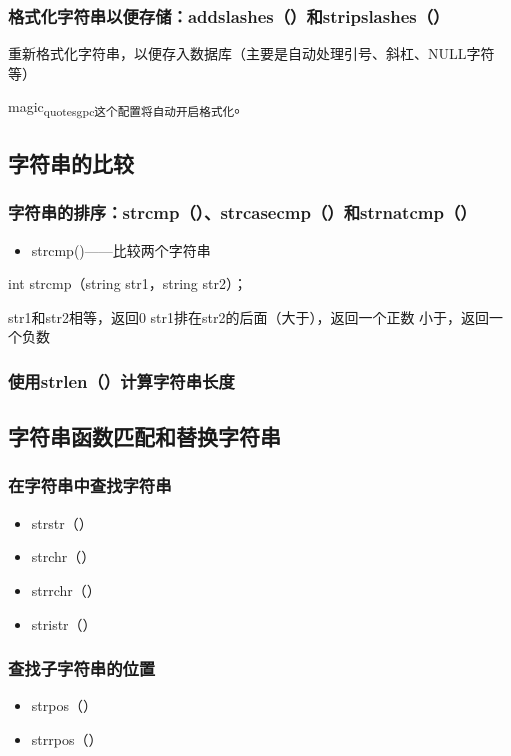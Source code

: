 \documentclass[11pt]{article}
\begin{document}
\subsubsection{格式化字符串以便存储：addslashes（）和stripslashes（）}
\label{sec:orgb579952}
重新格式化字符串，以便存入数据库（主要是自动处理引号、斜杠、NULL字符等）

magic\textsubscript{quotes}\textsubscript{gpc这个配置将自动开启格式化}。
\subsection{字符串的比较}
\label{sec:orgff0bb8f}
\subsubsection{字符串的排序：strcmp（）、strcasecmp（）和strnatcmp（）}
\label{sec:orgf145227}
\begin{itemize}
\item strcmp()——比较两个字符串
\end{itemize}
int strcmp（string str1，string str2）；

str1和str2相等，返回0
str1排在str2的后面（大于），返回一个正数
小于，返回一个负数
\subsubsection{使用strlen（）计算字符串长度}
\label{sec:org9e1e347}
\subsection{字符串函数匹配和替换字符串}
\label{sec:orgbbb0f21}
\subsubsection{在字符串中查找字符串}
\label{sec:orgfe89807}
\begin{itemize}
\item strstr（）
\item strchr（）
\item strrchr（）
\item stristr（）
\end{itemize}
\subsubsection{查找子字符串的位置}
\label{sec:org0da5853}
\begin{itemize}
\item strpos（）
\item strrpos（）
\end{itemize}
\end{document}
